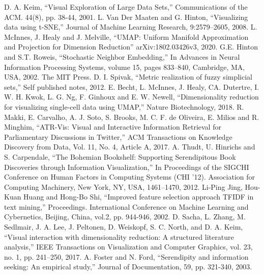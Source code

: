 \documentclass[conference]{IEEEtran}
\begin{document}
\begin{thebibliography}{00}
 D. A. Keim,  ``Visual Exploration of Large Data Sets,'' Communications of the ACM. 44(8), pp. 38-44, 2001.
 L. Van Der Maaten and G. Hinton, ``Visualizing data using t-SNE,''  Journal of Machine Learning Research, 9:2579–2605, 2008.
 L. McInnes, J. Healy and J. Melville, ``UMAP: Uniform Manifold Approximation and Projection for Dimension Reduction'' arXiv:1802.03426v3, 2020.
 G.E. Hinton and S.T. Roweis, ``Stochastic Neighbor Embedding,'' In Advances in Neural Information Processing Systems, volume 15, pages 833–840, Cambridge, MA, USA, 2002. The MIT Press.
 D. I. Spivak, ``Metric realization of fuzzy simplicial sets,'' Self published
notes, 2012.
 E. Becht, L. McInnes, J. Healy, CA. Dutertre, I. W. H. Kwok, L. G. Ng, F. Ginhoux and E. W. Newell, ``Dimensionality reduction for visualizing single-cell data using UMAP,'' Nature Biotechnology, 2018.
 R. Makki, E. Carvalho, A. J. Soto, S. Brooks, M. C. F. de Oliveira, E. Milios and R. Minghim, ``ATR-Vis: Visual and Interactive Information Retrieval for Parliamentary Discussions in Twitter,'' ACM Transactions on Knowledge Discovery from Data, Vol. 11, No. 4, Article A, 2017.
 A. Thudt, U. Hinrichs and S. Carpendale, ``The Bohemian Bookshelf: Supporting Serendipitous Book Discoveries through Information Visualization,'' In Proceedings of the SIGCHI Conference on Human Factors in Computing Systems (CHI '12). Association for Computing Machinery, New York, NY, USA, 1461–1470, 2012. 
 Li-Ping Jing, Hou-Kuan Huang and Hong-Bo Shi, ``Improved feature selection approach TFIDF in text mining,'' Proceedings. International Conference on Machine Learning and Cybernetics, Beijing, China, vol.2, pp. 944-946, 2002.
 D. Sacha, L. Zhang, M. Sedlmair, J. A. Lee, J. Peltonen, D. Weiskopf, S. C. North, and D. A. Keim, ``Visual interaction with dimensionality reduction: A structured literature analysis,'' IEEE Transactions on Visualization and Computer Graphics, vol. 23, no. 1, pp. 241–250, 2017.
 A. Foster and N. Ford, ``Serendipity and information seeking: An empirical study,'' Journal of Documentation, 59, pp. 321-340, 2003.

\end{thebibliography}
\end{document}
